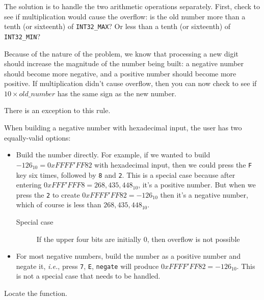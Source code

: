 The solution is to handle the two arithmetic operations separately.
First, check to see if multiplication would cause the overflow:
is the old number more than a tenth (or sixteenth) of \lstinline{INT32_MAX}?
Or less than a tenth (or sixteenth) of \lstinline{INT32_MIN}?

Because of the nature of the problem, we know that processing a new digit should increase the magnitude of the number being built:
a negative number should become more negative, and a positive number should become more positive.
If multiplication didn't cause overflow, then you can now check to see if $10 \times old\_number$ has the same sign as the new number.

There is an exception to this rule.

When building a negative number with hexadecimal input, the user has two equally-valid options:

\begin{itemize}
    \item Build the number directly.
        For example, if we wanted to build $-126_{10} = 0xFFFF'FF82$ with hexadecimal input, then we could press the \texttt{F} key six times, followed by \texttt{8} and \texttt{2}.
        This is a special case because after entering $0xFFF'FFF8 = 268,435,448_{10}$, it's a positive number.
        But when we press the \texttt{2} to create $0xFFFF'FF82 = -126_{10}$ then it's a negative number, which of course is less than $268,435,448_{10}$.
        \begin{description}
            \item[Special case] If the upper four bits are initially 0, then overflow is not possible
        \end{description}
    \item For most negative numbers, build the number as a positive number and negate it,
        \textit{i.e.}, press \texttt{7}, \texttt{E}, \texttt{negate} will produce $0xFFFF'FF82 = -126_{10}$.
        This is not a special case that needs to be handled.
\end{itemize}

Locate the  function.
\begin{description}
\end{description}

